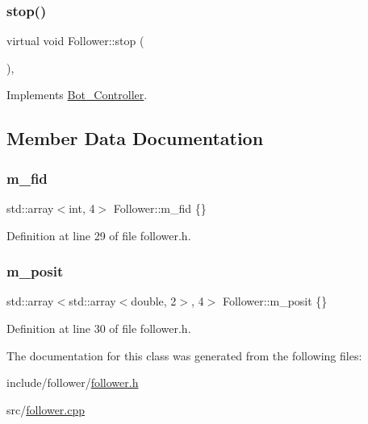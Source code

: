 \subsubsection{\texorpdfstring{stop()}{stop()}}
{\footnotesize\ttfamily virtual void Follower\+::stop (\begin{DoxyParamCaption}{ }\end{DoxyParamCaption})\hspace{0.3cm}{\ttfamily [override]}, {\ttfamily [virtual]}}



Implements \hyperlink{class_bot___controller_a28d1caa8c0ed9d8fb313caacecc5e71b}{Bot\+\_\+\+Controller}.



\subsection{Member Data Documentation}
\mbox{\label{class_follower_a350054bbd7659d493cccc4b4ad9bc460}} 
\subsubsection{\texorpdfstring{m\+\_\+fid}{m\_fid}}
{\footnotesize\ttfamily std\+::array$<$int, 4$>$ Follower\+::m\+\_\+fid \{\}}



Definition at line 29 of file follower.\+h.

\mbox{\label{class_follower_a6d4e1ebbe79cc8af601d53cba7aeb30a}} 
\subsubsection{\texorpdfstring{m\+\_\+posit}{m\_posit}}
{\footnotesize\ttfamily std\+::array$<$std\+::array$<$double, 2$>$, 4$>$ Follower\+::m\+\_\+posit \{\}}



Definition at line 30 of file follower.\+h.



The documentation for this class was generated from the following files\+:\begin{DoxyCompactItemize}
\item 
include/follower/\hyperlink{follower_8h}{follower.\+h}\item 
src/\hyperlink{follower_8cpp}{follower.\+cpp}\end{DoxyCompactItemize}

